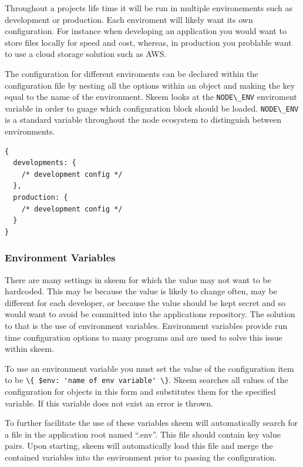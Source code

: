 \documentclass[
  12pt,
]{article}
\newcommand{\passthrough}[1]{#1}
\begin{document}
Throughout a projects life time it will be run in multiple environements
such as development or production. Each enviroment will likely want its
own configuration. For instance when developing an application you would
want to store files locally for speed and cost, whereas, in production
you problable want to use a cloud storage solution such as AWS.

The configuration for different enviroments can be declared within the
configuration file by nesting all the options within an object and
making the key equal to the name of the environment. Skeem looks at the
\passthrough{\lstinline!NODE\_ENV!} enviroment variable in order to
guage which configuration block should be loaded.
\passthrough{\lstinline!NODE\_ENV!} is a standard variable throughout
the node ecosystem to distinguish between environments.

\begin{lstlisting}[caption={An example of a config with multiple environments.}]
{
  developments: {
    /* development config */
  },
  production: {
    /* development config */
  }
}
\end{lstlisting}

\hypertarget{environment-variables}{%
\subsubsection{Environment Variables}\label{environment-variables}}

There are many settings in skeem for which the value may not want to be
hardcoded. This may be because the value is likely to change often, may
be different for each developer, or because the value should be kept
secret and so would want to avoid be committed into the applications
repository. The solution to that is the use of environment variables.
Environment variables provide run time configuration options to many
programs and are used to solve this issue within skeem.

To use an environment variable you must set the value of the
configuration item to be
\passthrough{\lstinline!\{ $env: 'name of env variable' \}!}. Skeem
searches all values of the configuration for objects in this form and
substitutes them for the specified variable. If this variable does not
exist an error is thrown.

To further facilitate the use of these variables skeem will
automatically search for a file in the application root named ``.env''.
This file should contain key value pairs. Upon starting, skeem will
automatically load this file and merge the contained variables into the
environment prior to passing the configuration.
\end{document}
